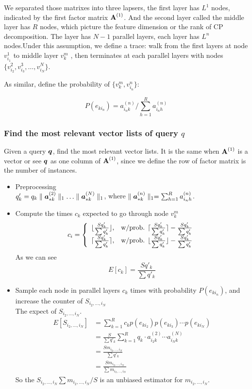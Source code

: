 \documentclass{article}
\newcommand{\Sca}[3]{{#1}^{(#2)}_{i_#2#3}}%
\newcommand{\V}[1]{{\bm{{\MakeLowercase{#1}}}}}%
\newcommand{\Vacol}[1]{\V{a}^{(#1)}_{*k}}
\newcommand{\M}[1]{{\bm{\mathbf{\MakeUppercase{#1}}}}}%
\newcommand{\norm}[2]{\parallel#1\parallel_{#2}}
\begin{document}
We separated those matrixes into three lapsers, the first layer has $L^{1}$ nodes, indicated by the first factor matrix $\M{A}^{(1)}$. And the second layer called the middle layer has $R$ nodes, which picture the feature dimension or the rank of CP decomposition. The layer has $N-1$ parallel layers, each layer has $L^{n}$ nodes.Under this assumption, we define a trace: walk from the first layers at node $v_{i_1}^1$ to middle layer $v_{k}^m$ , then terminates at each parallel layers with nodes $\{v_{i_2}^2,v_{i_3}^3,\ldots,v_{i_N}^N\}$.

As similar, define the probability of $\{v_k^m,v_{i_n}^n\}$:

\[P(e_{ki_n}) = \Sca{a}{n}{k}/\sum_{h=1}^{R}\Sca{a}{n}{h}\]
\subsubsection{Find the most relevant vector lists of query $q$}

Given a query $\V{q}$, find the most relevant vector lists. It is the same when $\M{A}^{(1)}$ is a vector or see $\V{q}$ as one column of $\M{A}^{(1)}$, since we define the row of factor matrix is the number of instances.

\begin{itemize}
  \item Preprocessing\\
   $q'_k = q_k\norm{\Vacol{2}}{1}\ldots\norm{\Vacol{N}}{1}$, where $\norm{\Vacol{n}}{1} = \sum_{h=1}^{R}\Sca{a}{n}{h}$.
  \item Compute the times $c_k$ expected to go through node $v_k^m$\\
    \begin{equation*}c_i=
    \left\{
      \begin{array}{ll}
        \lfloor \frac{Sq'_k}{\sum q'_k} \rfloor,
        & \hbox{w/prob. $\lceil \frac{Sq'_k}{\sum q'_k} \rceil - \frac{Sq'_k}{\sum q'_k}$} \\
        \lceil \frac{Sq'_k}{\sum q'_k} \rceil,
        & \hbox{w/prob. $\lfloor \frac{Sq'_k}{\sum q'_k} \rfloor - \frac{Sq'_k}{\sum q'_k}$}
      \end{array}
    \right.
    \end{equation*}
    As we can see \[ E[c_k] = \frac{Sq'_k}{\sum q'_k}\]
  \item Sample each node in parallel layers $c_k$ times with probability $P(e_{ki_n})$, and increase the counter of $S_{i_2,\ldots,i_N}$ \\
  The expect of $S_{i_2,\ldots,i_N}$.
        \begin{align*}
        E[S_{i_2,\ldots,i_N}] &= \sum_{k=1}^{R} c_k p(e_{ki_2}) p(e_{ki_3}) \cdots p(e_{ki_N})\\
               &= \frac{S}{{\sum q'_k}}\sum_{k=1}^{R}q_k\cdot\Sca{a}{2}{k}\cdots\Sca{a}{N}{k}\\
               &= \frac{Sm_{i_2,\ldots,i_N}}{{\sum q'_k}}\\
               &= \frac{Sm_{i_2,\ldots,i_N}}{{\sum m_{i_2,\ldots,i_N}}}
        \end{align*}
    So the  $S_{i_2,\ldots,i_N}{\sum m_{i_2,\ldots,i_N}}/S$ is an unbiased estimator for $m_{i_2,\ldots,i_N}$.
\end{itemize}
\end{document}
